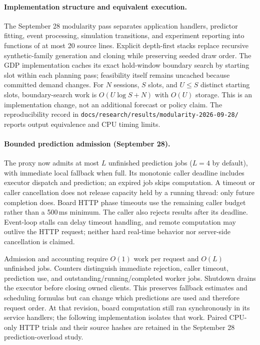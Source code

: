 \paragraph{Implementation structure and equivalent execution.}
The September 28 modularity pass separates application handlers, predictor
fitting, event processing, simulation transitions, and experiment reporting into
functions of at most 20 source lines. Explicit depth-first stacks replace recursive
synthetic-family generation and cloning while preserving seeded draw order.
The GDP implementation caches its exact hold-window boundary search by starting
slot within each planning pass; feasibility itself remains uncached because
committed demand changes. For $N$ sessions, $S$ slots, and $U\leq S$ distinct
starting slots, boundary-search work is $O(U\log S+N)$ with $O(U)$ storage.
This is an implementation change, not an additional forecast or policy claim.
The reproducibility record in \texttt{docs/research/results/modularity-2026-09-28/}
reports output equivalence and CPU timing limits.


\paragraph{Bounded prediction admission (September 28).}
The proxy now admits at most $L$ unfinished prediction jobs ($L=4$ by default),
with immediate local fallback when full. Its monotonic caller deadline includes
executor dispatch and prediction; an expired job skips computation. A timeout or
caller cancellation does not release capacity held by a running thread: only
future completion does. Board HTTP phase timeouts use the remaining caller
budget rather than a 500\,ms minimum. The caller also rejects results after its
deadline. Event-loop stalls can delay timeout handling, and remote computation
may outlive the HTTP request; neither hard real-time behavior nor server-side
cancellation is claimed.

Admission and accounting require $O(1)$ work per request and $O(L)$ unfinished
jobs. Counters distinguish immediate rejection, caller timeout, prediction use,
and outstanding/running/completed worker jobs. Shutdown drains the executor
before closing owned clients. This preserves fallback estimates and scheduling
formulas but can change which predictions are used and therefore request order.
At that revision, board computation still ran synchronously in its service
handlers; the following implementation isolates that work. Paired CPU-only HTTP trials and their
source hashes are retained in the September 28 prediction-overload study.

